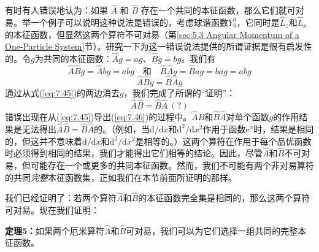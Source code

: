     有时有人错误地认为：如果 $\hat{A}$ 和 $\hat{B}$ 存在一个共同的本征函数，那么它们就可对易。举一个例子可以说明这种说法是错误的，考虑球谐函数$Y_0^0$，它同时是$\hat{L}_z$和$\hat{L}_x$的本征函数，但显然这两个算符不可对易（第\ref{sec:5.3 Angular Momentum of a One-Particle System}节）。研究一下为这一错误说法提供的所谓证据是很有启发性的。令$g$为共同的本征函数：$\hat{A}g = ag$、$\hat{B}g = bg$。我们有
    \begin{equation*}
        \hat{A}\hat{B}g = \hat{A}bg = abg \quad \text{和} \quad \hat{B}\hat{A}g = \hat{B}ag = bag = abg
    \end{equation*}
    \begin{equation}
        \hat{A}\hat{B}g = \hat{B}\hat{A}g
        \label{eq:7.45}
    \end{equation}
    通过从式(\ref{eq:7.45})的两边消去$g$，我们完成了所谓的“证明”：
    \begin{equation}
        \hat{A}\hat{B} = \hat{B}\hat{A}\:(?)
        \label{eq:7.46}
    \end{equation}
    错误出现在从(\ref{eq:7.45})导出(\ref{eq:7.46})的过程中。$\hat{A}\hat{B}$和$\hat{B}\hat{A}$对单个函数$g$的作用结果是无法得出$\hat{A}\hat{B} = \hat{B}\hat{A}$的。（例如，当$\mathrm{d}/\mathrm{d}x$和$\mathrm{d}^2/\mathrm{d}x^2$作用于函数$\mathrm{e}^x$时，结果是相同的，但这并不意味着$\mathrm{d}/\mathrm{d}x$和$\mathrm{d}^2/\mathrm{d}x^2$是相等的。）这两个算符在作用于每个品优函数时必须得到相同的结果，我们才能得出它们相等的结论。因此，尽管$\hat{A}$和$\hat{B}$不可对易，但可能存在一个或更多的共同本征函数。然而，我们不可能有两个非对易算符的共同\textit{完整}本征函数集，正如我们在本节前面所证明的那样。

    我们已经证明了：若两个算符$\hat{A}$和$\hat{B}$的本征函数完全集是相同的，那么这两个算符可对易。现在我们证明：
    \begin{center}
        \parbox{0.8\textwidth}{
            \textbf{定理5：}如果两个厄米算符$\hat{A}$和$\hat{B}$可对易，我们可以为它们选择一组共同的完整本征函数。
        }
    \end{center}

